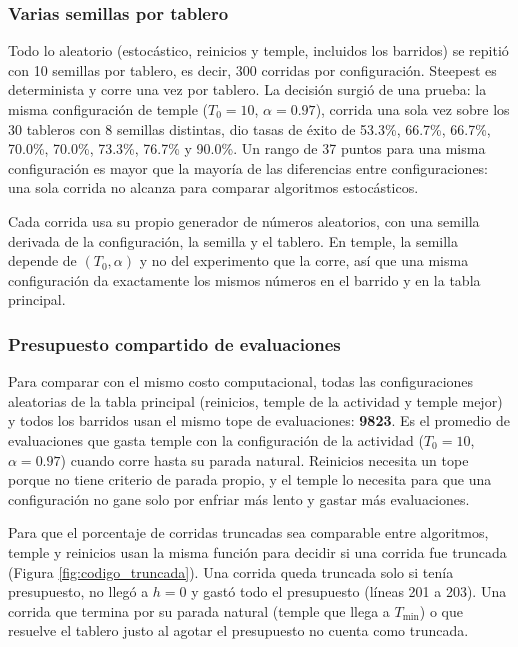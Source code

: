 \documentclass[12pt,a4paper]{article}
\begin{document}
\subsubsection{Varias semillas por tablero}

Todo lo aleatorio (estocástico, reinicios y temple, incluidos los
barridos) se repitió con 10 semillas por tablero, es decir, 300
corridas por configuración. Steepest es determinista y corre una vez
por tablero. La decisión surgió de una prueba: la misma configuración
de temple ($T_0 = 10$, $\alpha = 0.97$), corrida una sola vez sobre los
30 tableros con 8 semillas distintas, dio tasas de éxito de 53.3\%,
66.7\%, 66.7\%, 70.0\%, 70.0\%, 73.3\%, 76.7\% y 90.0\%. Un rango de 37
puntos para una misma configuración es mayor que la mayoría de las
diferencias entre configuraciones: una sola corrida no alcanza para
comparar algoritmos estocásticos.

Cada corrida usa su propio generador de números aleatorios, con una
semilla derivada de la configuración, la semilla y el tablero. En
temple, la semilla depende de $(T_0, \alpha)$ y no del experimento que
la corre, así que una misma configuración da exactamente los mismos
números en el barrido y en la tabla principal.

\subsubsection{Presupuesto compartido de evaluaciones}

Para comparar con el mismo costo computacional, todas las
configuraciones aleatorias de la tabla principal (reinicios, temple de
la actividad y temple mejor) y todos los barridos usan el mismo tope de
evaluaciones: \textbf{9823}. Es el promedio de evaluaciones que gasta
temple con la configuración de la actividad ($T_0 = 10$,
$\alpha = 0.97$) cuando corre hasta su parada natural. Reinicios
necesita un tope porque no tiene criterio de parada propio, y el temple
lo necesita para que una configuración no gane solo por enfriar más
lento y gastar más evaluaciones.

Para que el porcentaje de corridas truncadas sea comparable entre
algoritmos, temple y reinicios usan la misma función para decidir si
una corrida fue truncada (Figura \ref{fig:codigo_truncada}). Una
corrida queda truncada solo si tenía presupuesto, no llegó a $h = 0$ y
gastó todo el presupuesto (líneas 201 a 203). Una corrida que termina
por su parada natural (temple que llega a $T_{\min}$) o que resuelve el
tablero justo al agotar el presupuesto no cuenta como truncada.
\end{document}
